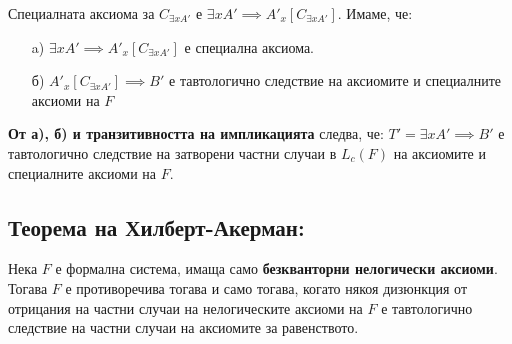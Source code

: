 \documentclass[french]{article}
\begin{document}
	Специалната аксиома за $C_{\exists x A'}$ е $\exists x A' \implies 
	A'_{x}[C_{\exists x A'}] $.
	Имаме, че: 
	\begin{itemize}
		\item[a)]  $\exists x A' \implies A'_{x}[C_{\exists x A'}]$ е специална аксиома.
		\item[б)] $A'_{x}[C_{\exists x A'}] \implies B'$  е тавтологично следствие на аксиомите и специалните аксиоми на $F$
		
	\end{itemize}
\textbf{От а), б) и транзитивността на импликацията} следва, че: \newline
 $T' = \exists x A' \implies B'$ е тавтологично следствие на затворени частни случаи в $L_c(F)$ на аксиомите и специалните аксиоми на $F$.

\subsection*{Теорема на Хилберт-Акерман:}
Нека $F$ е формална система, имаща само \textbf{безкванторни нелогически аксиоми}. Тогава $F$ е противоречива тогава и само тогава, когато някоя дизюнкция от отрицания на частни случаи на нелогическите аксиоми на $F$ е тавтологично следствие на частни случаи на аксиомите за равенството.
\end{document}
